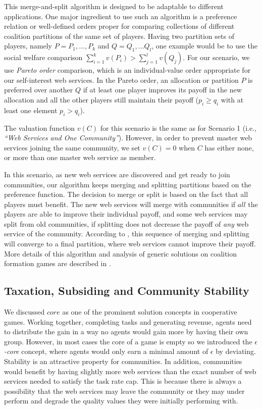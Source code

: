 \documentclass[10pt,journal,cspaper,compsoc]{IEEEtran}
\begin{document}
This merge-and-split algorithm is designed to be adaptable to
different applications. One major ingredient to use such an
algorithm is a preference relation or well-defined orders proper
for comparing collections of different coalition partitions of the
same set of players. Having two partition sets of players, namely
$P = {P_1,...,P_k}$ and $Q = {Q_1,...Q_l}$, one example would be
to use the social welfare comparison $\sum^k_{i=1}v(P_i) >
\sum^l_{j=1}v(Q_j)$. For our scenario, we use \emph{Pareto order}
comparison, which is an individual-value order appropriate for our
self-interest web services. In the Pareto order, an allocation or
partition $P$ is preferred over another $Q$ if at least one player
improves its payoff in the new allocation and all the other
players still maintain their payoff ($p_i \geq q_i$ with at least
one element $p_i > q_i$).

The valuation function $v(C)$ for this scenario is the same as for
Scenario 1 (i.e., \emph{``Web Services and One Community''}).
However, in order to prevent master web services joining the same
community, we set $v(C) = 0$ when $C$ has either none, or more
than one master web service as member.

In this scenario, as new web services are discovered and get ready
to join communities, our algorithm keeps merging and splitting
partitions based on the preference function. The decision to merge
or split is based on the fact that all players must benefit. The
new web services will merge with communities if $all$ the players
are able to improve their individual payoff, and some web services
may split from old communities, if splitting does not decrease the
payoff of \emph{any} web service of the community. According to
\cite{DBLP:journals/corr/abs-cs-0605132}, this sequence of merging
and splitting will converge to a final partition, where web
services cannot improve their payoff. More details of this
algorithm and analysis of generic solutions on coalition formation
games are described in \cite{DBLP:journals/igtr/AptW09}.

\subsection{Taxation, Subsiding and Community Stability}\label{s:tax}

We discussed $core$ as one of the prominent solution concepts in
cooperative games. Working together, completing tasks and
generating revenue, agents need to distribute the gain in a way no
agents would gain more by having their own group. However, in most
cases the core of a game is empty so we introduced the
\emph{$\epsilon$-core} concept, where agents would only earn a
minimal amount of $\epsilon$ by deviating. Stability is an
attractive property for communities. In addition, communities
would benefit by having slightly more web services than the exact
number of web services needed to satisfy the task rate cap. This
is because there is always a possibility that the web services may
leave the community or they may under perform and degrade the
quality values they were initially performing with.
\end{document}

